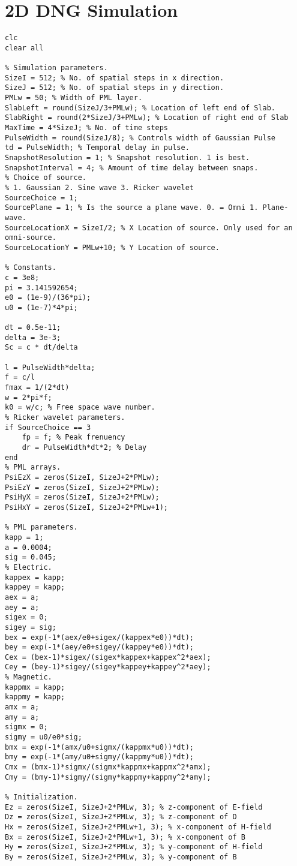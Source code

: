 \chapter{2D DNG Simulation}
\label{App:2DFDTDDNGMatlab}
\begin{lstlisting}
clc
clear all

% Simulation parameters.
SizeI = 512; % No. of spatial steps in x direction.
SizeJ = 512; % No. of spatial steps in y direction.
PMLw = 50; % Width of PML layer.
SlabLeft = round(SizeJ/3+PMLw); % Location of left end of Slab.
SlabRight = round(2*SizeJ/3+PMLw); % Location of right end of Slab
MaxTime = 4*SizeJ; % No. of time steps
PulseWidth = round(SizeJ/8); % Controls width of Gaussian Pulse
td = PulseWidth; % Temporal delay in pulse.
SnapshotResolution = 1; % Snapshot resolution. 1 is best.
SnapshotInterval = 4; % Amount of time delay between snaps.
% Choice of source.
% 1. Gaussian 2. Sine wave 3. Ricker wavelet
SourceChoice = 1;
SourcePlane = 1; % Is the source a plane wave. 0. = Omni 1. Plane-wave.
SourceLocationX = SizeI/2; % X Location of source. Only used for an omni-source.
SourceLocationY = PMLw+10; % Y Location of source.

% Constants.
c = 3e8;
pi = 3.141592654;
e0 = (1e-9)/(36*pi);
u0 = (1e-7)*4*pi;

dt = 0.5e-11;
delta = 3e-3;
Sc = c * dt/delta

l = PulseWidth*delta;
f = c/l
fmax = 1/(2*dt)
w = 2*pi*f;
k0 = w/c; % Free space wave number.
% Ricker wavelet parameters.
if SourceChoice == 3
    fp = f; % Peak frenuency
    dr = PulseWidth*dt*2; % Delay
end
% PML arrays.
PsiEzX = zeros(SizeI, SizeJ+2*PMLw);
PsiEzY = zeros(SizeI, SizeJ+2*PMLw);
PsiHyX = zeros(SizeI, SizeJ+2*PMLw);
PsiHxY = zeros(SizeI, SizeJ+2*PMLw+1);

% PML parameters.
kapp = 1;
a = 0.0004;
sig = 0.045;
% Electric.
kappex = kapp;
kappey = kapp;
aex = a;
aey = a;
sigex = 0;
sigey = sig;
bex = exp(-1*(aex/e0+sigex/(kappex*e0))*dt);
bey = exp(-1*(aey/e0+sigey/(kappey*e0))*dt);
Cex = (bex-1)*sigex/(sigex*kappex+kappex^2*aex);
Cey = (bey-1)*sigey/(sigey*kappey+kappey^2*aey);
% Magnetic.
kappmx = kapp;
kappmy = kapp;
amx = a;
amy = a;
sigmx = 0;
sigmy = u0/e0*sig;
bmx = exp(-1*(amx/u0+sigmx/(kappmx*u0))*dt);
bmy = exp(-1*(amy/u0+sigmy/(kappmy*u0))*dt);
Cmx = (bmx-1)*sigmx/(sigmx*kappmx+kappmx^2*amx);
Cmy = (bmy-1)*sigmy/(sigmy*kappmy+kappmy^2*amy);

% Initialization.
Ez = zeros(SizeI, SizeJ+2*PMLw, 3); % z-component of E-field
Dz = zeros(SizeI, SizeJ+2*PMLw, 3); % z-component of D
Hx = zeros(SizeI, SizeJ+2*PMLw+1, 3); % x-component of H-field
Bx = zeros(SizeI, SizeJ+2*PMLw+1, 3); % x-component of B
Hy = zeros(SizeI, SizeJ+2*PMLw, 3); % y-component of H-field
By = zeros(SizeI, SizeJ+2*PMLw, 3); % y-component of B


\end{lstlisting}

